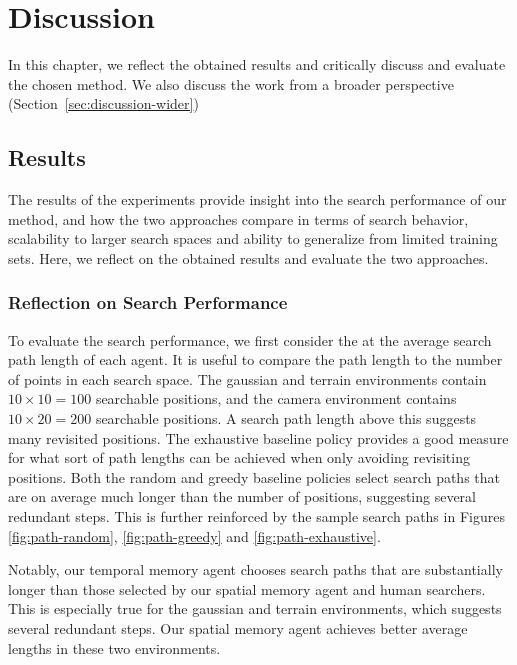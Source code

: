 \chapter{Discussion}
\label{cha:discussion}

In this chapter, we reflect the obtained results and critically discuss and evaluate the chosen method.
We also discuss the work from a broader perspective (Section~\ref{sec:discussion-wider})

\section{Results}
\label{sec:discussion-results}

The results of the experiments provide insight into the search performance of our method,
and how the two approaches compare in terms of search behavior, scalability to larger search spaces and ability to generalize from limited training sets.
Here, we reflect on the obtained results and evaluate the two approaches.

\subsection{Reflection on Search Performance}

To evaluate the search performance, we first consider the at the average search path length of each agent.
It is useful to compare the path length to the number of points in each search space.
The gaussian and terrain environments contain \(10 \times 10 = 100\) searchable positions, and the camera environment contains \(10 \times 20 = 200\) searchable positions.
A search path length above this suggests many revisited positions.
The exhaustive baseline policy provides a good measure for what sort of path lengths can be achieved when only avoiding revisiting positions.
Both the random and greedy baseline policies select search paths that are on average much longer than the number of positions, suggesting several redundant steps.
This is further reinforced by the sample search paths in Figures \ref{fig:path-random}, \ref{fig:path-greedy} and \ref{fig:path-exhaustive}.

Notably, our temporal memory agent chooses search paths that are substantially longer than those selected by our spatial memory agent and human searchers.
This is especially true for the gaussian and terrain environments, which suggests several redundant steps.
Our spatial memory agent achieves better average lengths in these two environments.

